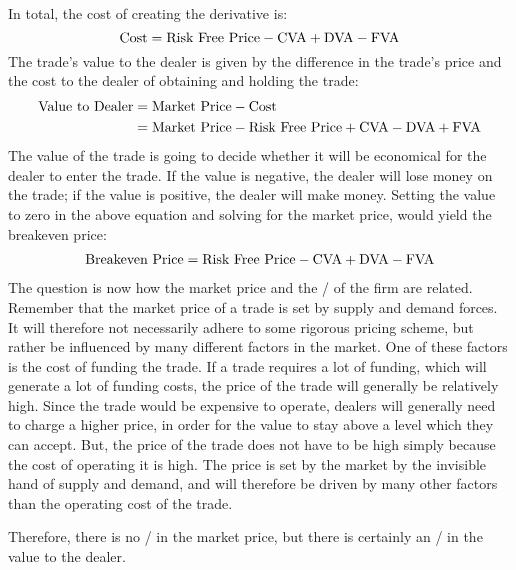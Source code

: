 \documentclass[main.tex]{subfiles}
\begin{document}
    In total, the cost of creating the derivative is:
        \begin{equation*}
            \text{Cost} = \text{Risk Free Price} - \CVA/ + \DVA/ - \FVA/
        \end{equation*}
    The trade's value to the dealer is given by the difference in the trade's price
    and the cost to the dealer of obtaining and holding the trade:
        \begin{align*}
            \text{Value to Dealer} 
            &=
            \text{Market Price}
            -
            \text{Cost} 
            \\
            &= \text{Market Price} - \text{Risk Free Price} + \CVA/ - \DVA/ + \FVA/
        \end{align*}
    The value of the trade is going to decide whether it will be economical 
    for the dealer to enter the trade. 
    If the value is negative, the dealer will lose money on the trade;
    if the value is positive, the dealer will make money.
    Setting the value to zero in the above equation and solving for the market price, 
    would yield the breakeven price:
        \begin{align*}
            \text{Breakeven Price}
            =
            \text{Risk Free Price} - \CVA/ + \DVA/ - \FVA/
        \end{align*}
    The question is now how the market price and the \FVA/ of the firm are related.
    Remember that the market price of a trade is set by supply and demand forces.
    It will therefore not necessarily adhere to some rigorous pricing scheme,
    but rather be influenced by many different factors in the market.
    One of these factors is the cost of funding the trade.
    If a trade requires a lot of funding, which will generate a lot of funding costs,
    the price of the trade will generally be relatively high.
    Since the trade would be expensive to operate, 
    dealers will generally need to charge a higher price, 
    in order for the value to stay above a level which they can accept.
    But, the price of the trade does not have to be high 
    simply because the cost of operating it is high.
    The price is set by the market by the invisible hand of supply and demand,
    and will therefore be driven by many other factors than the operating cost of the trade.
    
    Therefore, there is no \FVA/ in the market price, 
    but there is certainly an \FVA/ in the value to the dealer.
\end{document}
